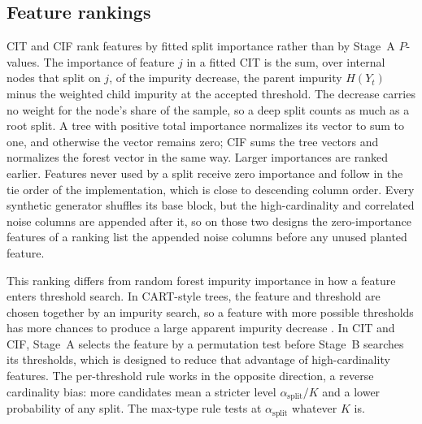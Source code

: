 \subsection{Feature rankings}
\label{sec:rank-construction}

CIT and CIF rank features by fitted split importance rather than by Stage~A
$P$-values. The importance of feature $j$ in a fitted CIT is the sum, over
internal nodes that split on $j$, of the impurity decrease, the parent impurity
$H(Y_t)$ minus the weighted child impurity at the accepted threshold. The decrease carries no weight for the node's share of the
sample, so a deep split counts as much as a root split. A tree with positive
total importance normalizes its vector to sum to one, and otherwise the vector
remains zero; CIF sums the tree vectors and normalizes the forest vector in the
same way. Larger importances are ranked earlier. Features never used by a split
receive zero importance and follow in the tie order of the implementation,
which is close to descending column order. Every synthetic generator shuffles
its base block, but the high-cardinality and correlated noise columns are
appended after it, so on those two designs the zero-importance features of a ranking list
the appended noise columns before any unused planted feature.

This ranking differs from random forest impurity importance in how a feature
enters threshold search. In CART-style trees, the feature and threshold are
chosen together by an impurity search, so a feature with more possible
thresholds has more chances to produce a large apparent impurity decrease
\citep{Strobl2007BiasRFVariableImportance}. In CIT and CIF, Stage~A selects the
feature by a permutation test before Stage~B searches its thresholds, which is
designed to reduce that advantage of high-cardinality features. The
per-threshold rule works in the opposite direction, a reverse cardinality bias:
more candidates mean a stricter level $\alpha_{\mathrm{split}}/K$ and a lower
probability of any split. The max-type rule tests at $\alpha_{\mathrm{split}}$
whatever $K$ is.
